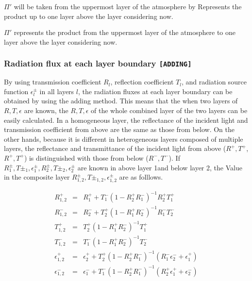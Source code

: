 \(\Pi'\) will be taken from the uppermost
layer of the atmosphere by Represents the product up to one layer above
the layer considering now.

\(\Pi'\) represents the product from the uppermost layer of the atmosphere 
to one layer above the layer considering now.

\hypertarget{radiation-flux-at-each-layer-boundary-adding}{%
\subsubsection{\texorpdfstring{Radiation flux at each layer boundary
\texttt{{[}ADDING{]}}}{Radiation flux at each layer boundary {[}ADDING{]}}}
\label{radiation-flux-at-each-layer-boundary-moduleadding}}

By using transmission coefficient \(R_l\), reflection coefficient
\(T_l\), and radiation source function \(\epsilon^\pm_l\) in all
layers \(l\), the radiation fluxes at each layer boundary can be
obtained by using the adding method. 
This means that the when two layers of
\(R,T,\epsilon\) are known, the \(R,T,\epsilon\) of the whole combined
layer of the two layers can be easily calculated. 
In a homogeneous layer, the
reflectance of the incident light and transmission
coefficient  from above are the same as those from below.
On the other hands, because it is different in
heterogeneous layers composed of multiple layers, the reflectance and 
transmittance of the incident light from above (\(R^+, T^+\), \(R^+, T^+\)) 
is distinguished with those from below (\(R^-, T^-\)). 
If \(R^\pm_1, T\pm_1, \epsilon^\pm_1,  R^\pm_2, T\pm_2, \epsilon^\pm_2\)
are known in above layer 1and below layer 2, the Value in the composite layer
\(R^\pm_{1,2}, T\pm_{1,2}, \epsilon^\pm_{1,2}\) are as folllows.  

\begin{eqnarray}
  R^+_{1,2} & = & R^+_1 + T^-_1 ( 1- R^+_2 R^-_1 )^{-1} R^+_2 T^+_1 \\
  R^-_{1,2} & = & R^-_2 + T^+_2 ( 1- R^+_1 R^-_2 )^{-1} R^-_1 T^-_2 \\
  T^+_{1,2} & = & T^+_2 ( 1- R^+_1 R^-_2 )^{-1} T^+_1 \\
  T^-_{1,2} & = & T^-_1 ( 1- R^+_1 R^-_2 )^{-1} T^-_2 \\
  \epsilon^+_{1,2} & = & \epsilon^+_2 
    + T^+_2 ( 1- R^+_2 R^-_1 )^{-1} ( R^-_1 \epsilon^-_2 + \epsilon^+_1 ) \\
  \epsilon^-_{1,2} & = & \epsilon^-_1 
    + T^-_1 ( 1- R^+_2 R^-_1 )^{-1} ( R^+_2 \epsilon^+_1 + \epsilon^-_2 ) 
\end{eqnarray}

